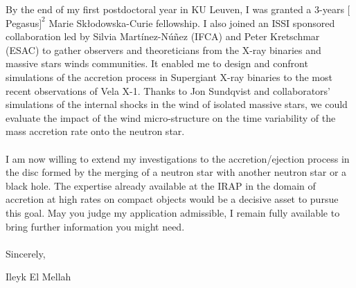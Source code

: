 \documentclass[12pt]{letter}
\begin{document}
\begin{letter} {}
\hspace*{0.5cm} By the end of my first postdoctoral year in KU Leuven, I was granted a 3-years $[$Pegasus$]^2$ Marie Sk\l{}odowska-Curie fellowship. I also joined an ISSI sponsored collaboration led by Silvia Mart\'{i}nez-N\'{u}\~{n}ez (IFCA) and Peter Kretschmar (ESAC) to gather observers and theoreticians from the X-ray binaries and massive stars winds communities. It enabled me to design and confront simulations of the accretion process in Supergiant X-ray binaries to the most recent observations of Vela X-1. Thanks to Jon Sundqvist and collaborators' simulations of the internal shocks in the wind of isolated massive stars, we could evaluate the impact of the wind micro-structure on the time variability of the mass accretion rate onto the neutron star.\\ \\
\hspace*{0.5cm} I am now willing to extend my investigations to the accretion/ejection process in the disc formed by the merging of a neutron star with another neutron star or a black hole. The expertise already available at the IRAP in the domain of accretion at high rates on compact objects would be a decisive asset to pursue this goal. May you judge my application admissible, I remain fully available to bring further information you might need.\\ \\
 
Sincerely,
 
\closing{Ileyk El Mellah} 


  \end{letter}
  
  
 
\end{document}
